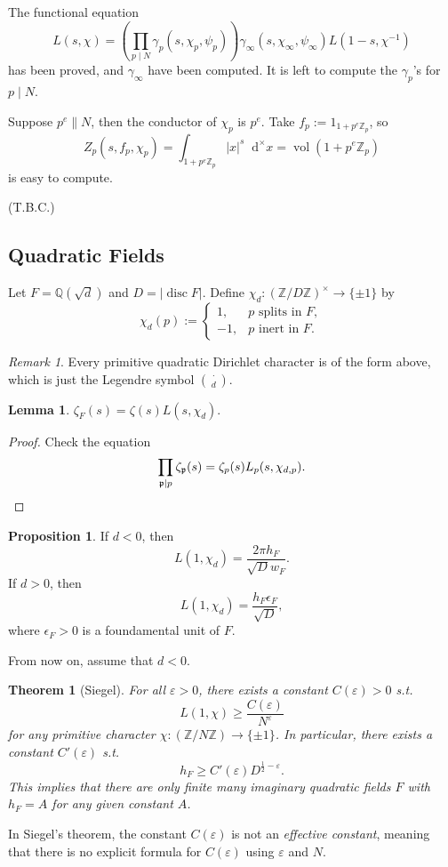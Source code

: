 \documentclass{article}
\newtheorem{theorem}{Theorem}
\theoremstyle{definition}
\newtheorem{proposition}{Proposition}[section]
\newtheorem{lemma}{Lemma}[section]
\theoremstyle{remark}
\newtheorem*{remark}{Remark}
\newcommand{\Q}{\mathbb{Q}}
\newcommand{\Z}{\mathbb{Z}}
\newcommand{\dxm}{\mathop{}\!\mathrm{d}^{\times}x}
\DeclareMathOperator{\vol}{vol}
\newcommand{\frp}{\mathfrak{p}}
\DeclareMathOperator{\disc}{disc}
\begin{document}
The functional equation
\[L(s, \chi) = \left( \prod_{p\mid N}\gamma_p(s, \chi_p, \psi_p) \right)\gamma_\infty(s, \chi_\infty, \psi_\infty)L(1-s, \chi^{-1})\]has been proved, and $\gamma_\infty$ have been computed.
It is left to compute the $\gamma_p$'s for $p\mid N$.

Suppose $p^e\parallel N$,
then the conductor of $\chi_p$ is $p^e$.
Take $f_p := 1_{1+p^e\Z_p}$, so
\[Z_p(s, f_p, \chi_p) = \int_{1+p^e\Z_p}|x|^s\dxm = \vol(1+p^e\Z_p)\]
is easy to compute.

(T.B.C.)


\subsection{Quadratic Fields}
Let $F = \Q(\sqrt{d})$ and $D = |\disc F|$.
Define $\chi_d : (\Z/D\Z)^\times\to \{\pm 1\}$ by \[\chi_d(p) := \begin{cases}
    1,&p\text{ splits in }F,\\
    -1,&p\text{ inert in }F.
\end{cases}\]
\begin{remark}
    Every primitive quadratic Dirichlet character is of the form above, which is just the Legendre symbol $\binom{\cdot}{d}$.
\end{remark}
\begin{lemma}
    $\zeta_F(s) = \zeta(s)L(s, \chi_d)$.
\end{lemma}
\begin{proof}
    Check the equation \[\prod_{\frp\mid p}\zeta_\frp(s) = \zeta_p(s)L_p(s, \chi_{d,p}).\qedhere\]
\end{proof}

\begin{proposition}
    If $d < 0$, then \[L(1, \chi_d) = \frac{2\pi h_F}{\sqrt{D}w_F}.\]
    If $d > 0$, then \[L(1, \chi_d) = \frac{h_F\epsilon_F}{\sqrt{D}},\]
    where $\epsilon_F > 0$ is a foundamental unit of $F$.
\end{proposition}

From now on, assume that $d < 0$.

\begin{theorem}
    [Siegel]
    For all $\varepsilon>0$, there exists a constant $C(\varepsilon) > 0$ s.t. \[L(1, \chi) \ge \frac{C(\varepsilon)}{N^\varepsilon}\] for any primitive character $\chi:(\Z/N\Z)\to\{\pm 1\}$.
    In particular, there exists a constant $C'(\varepsilon)$ s.t. \[h_F \ge C'(\varepsilon)D^{\frac{1}{2}-\varepsilon}.\]
    This implies that there are only finite many imaginary quadratic fields $F$ with $h_F = A$ for any given constant $A$.
\end{theorem}
In Siegel's theorem, the constant $C(\varepsilon)$ is not an \textit{effective constant}, meaning that there is no explicit formula for $C(\varepsilon)$ using $\varepsilon$ and $N$.
\end{document}
